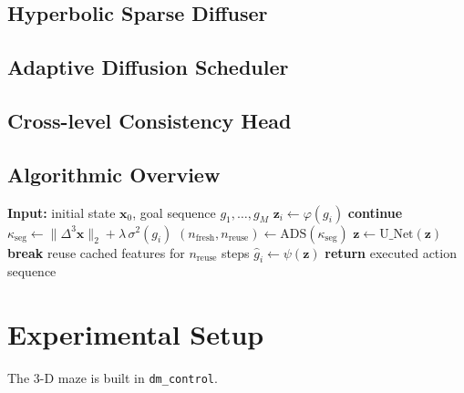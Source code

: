 \documentclass{article}
\begin{document}
\subsection{Hyperbolic Sparse Diffuser}

\subsection{Adaptive Diffusion Scheduler}

\subsection{Cross-level Consistency Head}

\subsection{Algorithmic Overview}
\begin{algorithm}[H]
  \caption{Segment-level planning with HADuS++}
  \begin{algorithmic}[1]
    \State \textbf{Input:} initial state $\mathbf x_0$, goal sequence $g_1,\dots,g_M$
      \State $\mathbf z_i \gets \varphi(g_i)$ 
        \State \textbf{continue} 
      \EndIf
      \State $\kappa_{\text{seg}} \gets \lVert\Delta^{3}\mathbf x\rVert_2 + \lambda\,\sigma^{2}(g_i)$
      \State $(n_{\text{fresh}},n_{\text{reuse}}) \gets \text{ADS}(\kappa_{\text{seg}})$
        \State $\mathbf z \gets \text{U\_Net}(\mathbf z)$
          \State \textbf{break} 
        \EndIf
      \EndFor
      \State reuse cached features for $n_{\text{reuse}}$ steps
      \State $\hat{g}_i \gets \psi(\mathbf z)$ 
    \EndFor
    \State \textbf{return} executed action sequence
  \end{algorithmic}
\end{algorithm}

\section{Experimental Setup}
The 3-D maze is built in \texttt{dm\_control}.
\end{document}
